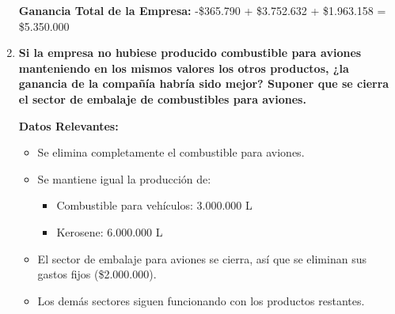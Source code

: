 \documentclass[10pt,a4paper]{article}
\begin{document}
\begin{enumerate}[label=\textbf{\sffamily\large\arabic*.}]
    \begin{center}
    \end{center}

    \vspace{0.5em}

    \textbf{Ganancia Total de la Empresa: } -\$365.790 + \$3.752.632 + \$1.963.158 = \$5.350.000

    \item {\bfseries\large Si la empresa no hubiese producido combustible para aviones manteniendo en los mismos valores los otros
    productos, ¿la ganancia de la compañía habría sido mejor? Suponer que se cierra el sector de embalaje de
    combustibles para aviones.}

    \vspace{0.5em}

    \textbf{Datos Relevantes:}

    \begin{itemize}

        \item Se elimina completamente el combustible para aviones.
        \item Se mantiene igual la producción de:
        
        \begin{itemize}

            \item Combustible para vehículos: 3.000.000 L
            \item Kerosene: 6.000.000 L
    
        \end{itemize}

        \item El sector de embalaje para aviones se cierra, así que se eliminan sus gastos fijos (\$2.000.000).
        \item Los demás sectores siguen funcionando con los productos restantes. \\


\end{itemize}
\end{enumerate}
\end{document}
